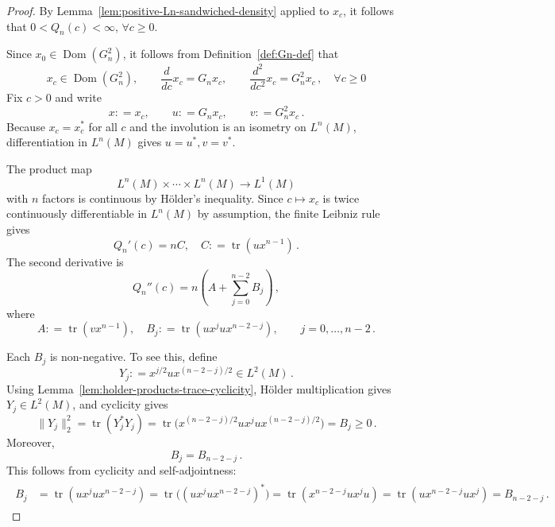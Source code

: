 \documentclass[11pt,a4paper]{article}
\theoremstyle{plain}
\numberwithin{theorem}{section}
\theoremstyle{definition}
\newcommand{\?}{\overset{?}{=}}
\newcommand{\defeq}{\mathrel{\mathop:}=}
\DeclareMathOperator{\tr}{tr}
\newcommand{\I}{\infty}
\DeclareMathOperator{\Dom}{Dom}
\begin{document}
\begin{proof}
By Lemma~\ref{lem:positive-Ln-sandwiched-density} applied to $x_c$, it follows that $0<Q_n(c)<\I, \, \forall c\geq0$.

Since $x_0\in\Dom(G_n^2)$, it follows from Definition~\ref{def:Gn-def} that
\begin{equation*}
     x_c\in\Dom(G_n^2),
  \qquad
  \frac{d}{dc}x_c=G_nx_c,
  \qquad
  \frac{d^2}{dc^2}x_c=G_n^2x_c\,, \quad \forall c\geq0
\end{equation*}
Fix $c> 0$ and write
\begin{equation}\label{eq:defn-xuv}
  x \defeq x_c,
  \qquad
  u \defeq G_nx_c,
  \qquad
  v \defeq G_n^2x_c\,.
\end{equation}
Because $x_c=x_c^*$ for all $c$ and the involution is an isometry on $L^n(M)$, differentiation in $L^n(M)$ gives $u=u^*,v=v^*$.

The product map
\begin{equation*}
  L^n(M)\times\cdots\times L^n(M)\longrightarrow L^1(M)
\end{equation*}
with $n$ factors is continuous by H\"older's inequality.  Since $c\mapsto x_c$ is twice continuously differentiable in $L^n(M)$ by assumption, the finite Leibniz rule gives
\begin{equation}\label{eq:Qp-C-defn}
    Q_n'(c)=nC, \quad  C \defeq \tr(ux^{n-1})\,.
\end{equation}
The second derivative is
\begin{equation}\label{eq:Qpp-regular}
  Q_n''(c)=n\left(A+\sum_{j=0}^{n-2}B_j\right)\,,
\end{equation}
where
\begin{equation}
  A \defeq \tr(vx^{n-1}),\quad  B_j \defeq \tr(ux^jux^{n-2-j}),
  \qquad j=0,\ldots,n-2\,.
\end{equation}

Each $B_j$ is non-negative.  To see this, define
\begin{equation}\label{eq:defn-Yj}
  Y_j \defeq x^{j/2}ux^{(n-2-j)/2}\in L^2(M)\,.
\end{equation}
Using Lemma~\ref{lem:holder-products-trace-cyclicity}, H\"older multiplication gives $Y_j\in L^2(M)$, and cyclicity gives
\begin{equation*}
  \|Y_j\|_2^2=\tr(Y_j^*Y_j)=\tr\bigl(x^{(n-2-j)/2}ux^jux^{(n-2-j)/2}\bigr)=B_j \geq0\,.
\end{equation*}
Moreover,
\begin{equation*}
  B_j=B_{n-2-j}\,.
\end{equation*}
This follows from cyclicity and self-adjointness:
\begin{align*}
\begin{aligned}
    B_j &=\tr(ux^jux^{n-2-j})=\tr\bigl((ux^jux^{n-2-j})^*\bigr)=\tr(x^{n-2-j}ux^ju)=\tr(ux^{n-2-j}ux^j)=B_{n-2-j}\,.
\end{aligned}
\end{align*}


\end{proof}
\end{document}

